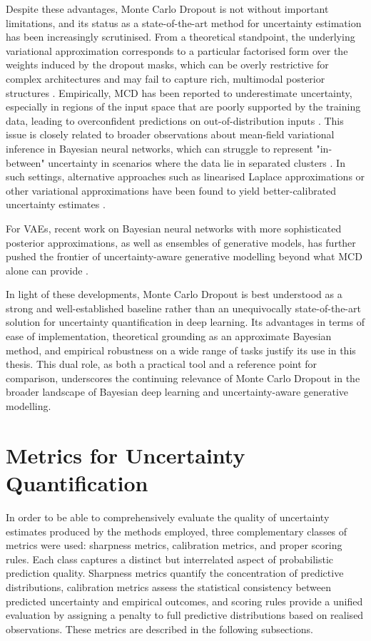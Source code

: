 Despite these advantages, Monte Carlo Dropout is not without important limitations, and its status as a state-of-the-art method for uncertainty estimation has been increasingly scrutinised. From a theoretical standpoint, the underlying variational approximation corresponds to a particular factorised form over the weights induced by the dropout masks, which can be overly restrictive for complex architectures and may fail to capture rich, multimodal posterior structures \citep{Gal2016Dropout,foong2019inbetween}. Empirically, MCD has been reported to underestimate uncertainty, especially in regions of the input space that are poorly supported by the training data, leading to overconfident predictions on out-of-distribution inputs \citep{foong2019inbetween}. This issue is closely related to broader observations about mean-field variational inference in Bayesian neural networks, which can struggle to represent "in-between" uncertainty in scenarios where the data lie in separated clusters \citep{foong2019inbetween}. In such settings, alternative approaches such as linearised Laplace approximations or other variational approximations have been found to yield better-calibrated uncertainty estimates \citep{foong2019inbetween}.

For VAEs, recent work on Bayesian neural networks with more sophisticated posterior approximations, as well as ensembles of generative models, has further pushed the frontier of uncertainty-aware generative modelling beyond what MCD alone can provide \citep{antoran2020thesis}.

In light of these developments, Monte Carlo Dropout is best understood as a strong and well-established baseline rather than an unequivocally state-of-the-art solution for uncertainty quantification in deep learning. Its advantages in terms of ease of implementation, theoretical grounding as an approximate Bayesian method, and empirical robustness on a wide range of tasks justify its use in this thesis. This dual role, as both a practical tool and a reference point for comparison, underscores the continuing relevance of Monte Carlo Dropout in the broader landscape of Bayesian deep learning and uncertainty-aware generative modelling.


\section{Metrics for Uncertainty Quantification} \label{UQ_metrics}

 
In order to be able to comprehensively evaluate the quality of uncertainty estimates produced by the methods employed, three complementary classes of metrics were used: sharpness metrics, calibration metrics, and proper scoring rules. Each class captures a distinct but interrelated aspect of probabilistic prediction quality. Sharpness metrics quantify the concentration of predictive distributions, calibration metrics assess the statistical consistency between predicted uncertainty and empirical outcomes, and scoring rules provide a unified evaluation by assigning a penalty to full predictive distributions based on realised observations. These metrics are described in the following subsections.



